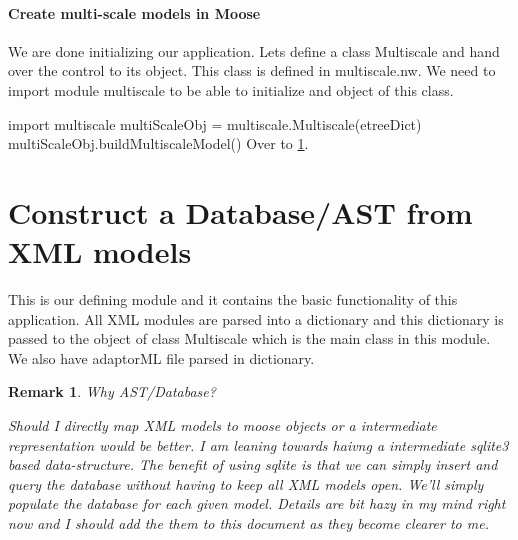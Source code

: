 \documentclass[]{article}%
\newtheorem{remark}{Remark}
\begin{document}
\eatline
{}\nwendcode{}\nwdocspar
\paragraph{Create multi-scale models in Moose}
  
  We are done initializing our application. Lets define a class {\Tt{}Multiscale\nwendquote}
  and hand over the control to its object. This class is defined in 
  {\Tt{}multiscale.nw\nwendquote}. We need to import module {\Tt{}multiscale\nwendquote} to be able to
  initialize and object of this class.

\nwenddocs{}\endmoddef\nwstartdeflinemarkup{}\nwenddeflinemarkup
import multiscale
multiScaleObj = multiscale.Multiscale(etreeDict)
multiScaleObj.buildMultiscaleModel()
\eatline
{}\nwendcode{}\nwdocspar
Over to \ref{sec:multiscale}.

\section{Construct a Database/AST from XML models}
\label{sec:multiscale}
  
  This is our defining module and it contains the basic functionality of this
  application. All XML modules are parsed into a dictionary and this dictionary
  is passed to the object of class {\Tt{}Multiscale\nwendquote} which is the main class in
  this module. We also have {\Tt{}adaptorML\nwendquote} file parsed in dictionary. 

\begin{remark}{Why AST/Database?}
 
 Should I directly map XML models to moose objects or a intermediate
 representation would be better. I am leaning towards haivng a intermediate
 sqlite3 based data-structure. The benefit of using sqlite is that we can simply
 insert and query the database without having to keep all XML models open. We'll
 simply populate the database for each given model. Details are bit hazy in my
 mind right now and I should add the them to this document as they become
 clearer to me.

\end{remark}
 
\end{document}
